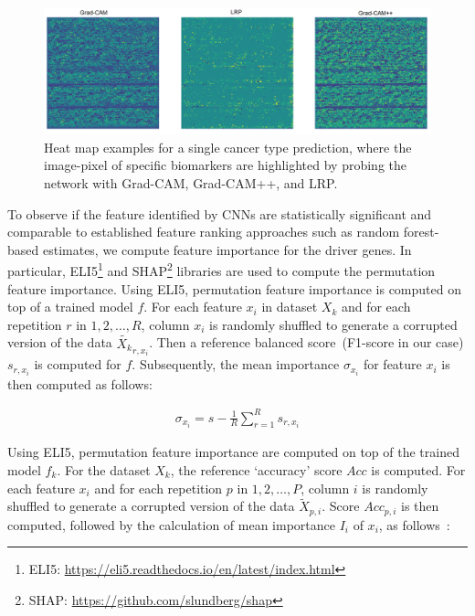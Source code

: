 \begin{figure}
	\centering
	\includegraphics[scale=0.7]{images/3_mode.png}
	\caption[Heat map examples for a single cancer type prediction]{Heat map examples for a single cancer type prediction, where the image-pixel of specific biomarkers are highlighted by probing the network with Grad-CAM, Grad-CAM++, and LRP.} 
	\label{fig:3hms}
\end{figure}

\hspace*{3.5mm} To observe if the feature identified by CNNs are statistically significant and comparable to established feature ranking approaches such as random forest-based estimates, we compute feature importance for the driver genes. In particular, ELI5\footnote{ELI5: \url{https://eli5.readthedocs.io/en/latest/index.html}} and SHAP\footnote{SHAP: \url{https://github.com/slundberg/shap}} libraries are used to compute the permutation feature importance. Using ELI5, permutation feature importance is computed on top of a trained model $f$. For each feature $x_i$ in dataset $X_k$ and for each repetition $r$ in $1, 2, \ldots, R$, column $x_i$ is randomly shuffled to generate a corrupted version of the data $\tilde{X_k}_{r,x_i}$. Then a reference balanced score~(F1-score in our case) $s_{r,x_i}$ is computed for $f$. Subsequently, the mean importance $\sigma_{x_i}$ for feature $x_{i}$ is then computed as follows: 

\begin{align}
    \sigma_{x_i}=s-\frac{1}{R} \sum_{r=1}^{R} s_{r,x_i}
\end{align}

\iffalse
Using ELI5, permutation feature importance are computed on top of the trained model $f_k$. For the dataset $X_k$, the reference `accuracy' score $Acc$ is computed. For each feature $x_i$ and for each repetition $p$ in $1, 2, \ldots, P$, column $i$ is randomly shuffled to generate a corrupted version of the data $\tilde{X}_{p,i}$. Score $Acc_{p,i}$ is then computed, followed by the calculation of mean importance $I_{i}$ of $x_{i}$, as follows~\cite{SHAP}:

